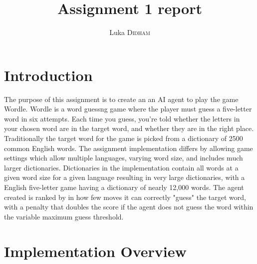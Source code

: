 \documentclass[12pt]{article}
\title{Assignment 1 report}
\author{Luka \textsc{Didham}}
\begin{document}
\maketitle


\section{Introduction}

The purpose of this assignment is to create an an AI agent to play the game Wordle. Wordle is a word guessng game where the player must guess a five-letter word in six attempts.
Each time you guess, you're told whether the letters in your chosen word are in the target word, and whether they are in the right place. Traditionally the target word for the game is picked from a
dictionary of 2500 common English words. The assignment implementation differs by allowing game settings which allow multiple languages, varying word size, and includes much larger dictionaries.
Dictionaries in the implementation contain all words at a given word size for a given language resulting in very large dictionaries, with a English five-letter game having a dictionary of nearly 12,000 words.
The agent created is ranked by in how few moves it can correctly "guess" the target word, with a penalty that doubles the score if the agent does not guess the word within the variable maximum guess threshold.

\section{Implementation Overview}
\end{document}

